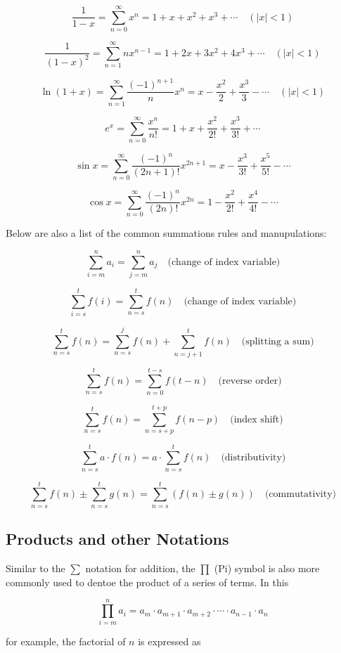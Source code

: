 \documentclass[12pt]{article}
\begin{document}
\[
\frac{1}{1 - x} = \sum_{n=0}^{\infty} x^n = 1 + x + x^2 + x^3 + \cdots \quad (\lvert x \rvert < 1)
\]

\[
\frac{1}{(1-x)^2} = \sum_{n=1}^{\infty} n x^{n-1} = 1 + 2x + 3x^2 + 4x^3 + \cdots \quad (\lvert x \rvert < 1)
\]

\[
\ln(1 + x) = \sum_{n=1}^{\infty} \frac{(-1)^{n+1}}{n} x^n = x - \frac{x^2}{2} + \frac{x^3}{3} - \cdots \quad (\lvert x \rvert < 1)
\]

\[
e^x = \sum_{n=0}^{\infty} \frac{x^n}{n!} = 1 + x + \frac{x^2}{2!} + \frac{x^3}{3!} + \cdots
\]

\[
\sin x = \sum_{n=0}^{\infty} \frac{(-1)^n}{(2n+1)!} x^{2n+1} = x - \frac{x^3}{3!} + \frac{x^5}{5!} - \cdots
\]

\[
\cos x = \sum_{n=0}^{\infty} \frac{(-1)^n}{(2n)!} x^{2n} = 1 - \frac{x^2}{2!} + \frac{x^4}{4!} - \cdots
\]

Below are also a list of the common summations rules and manupulations:

\[
\sum_{i=m}^{n} a_i = \sum_{j=m}^{n} a_j \quad \text{(change of index variable)}
\]

\[
\sum_{i=s}^{t} f(i) = \sum_{n=s}^{t} f(n) \quad \text{(change of index variable)}
\]

\[
\sum_{n=s}^{t} f(n) = \sum_{n=s}^{j} f(n) + \sum_{n=j+1}^{t} f(n) \quad \text{(splitting a sum)}
\]

\[
\sum_{n=s}^{t} f(n) = \sum_{n=0}^{t-s} f(t-n) \quad \text{(reverse order)}
\]

\[
\sum_{n=s}^{t} f(n) = \sum_{n=s+p}^{t+p} f(n-p) \quad \text{(index shift)}
\]

\[
\sum_{n=s}^{t} a \cdot f(n) = a \cdot \sum_{n=s}^{t} f(n) \quad \text{(distributivity)}
\]

\[
\sum_{n=s}^{t} f(n) \pm \sum_{n=s}^{t} g(n) = \sum_{n=s}^{t} \left(f(n) \pm g(n)\right) \quad \text{(commutativity)}
\]


\subsection{Products and other Notations}

Similar to the $\sum$ notation for addition, the $\prod$ (Pi) symbol is also more commonly used to dentoe the product of a series of terms. In this 

$$\prod_{i=m}^{n} a_i = a_m \cdot a_{m+1} \cdot a_{m+2} \cdot \cdots \cdot a_{n-1} \cdot a_n$$ 

for example, the factorial of $n$ is expressed as 
\end{document}
